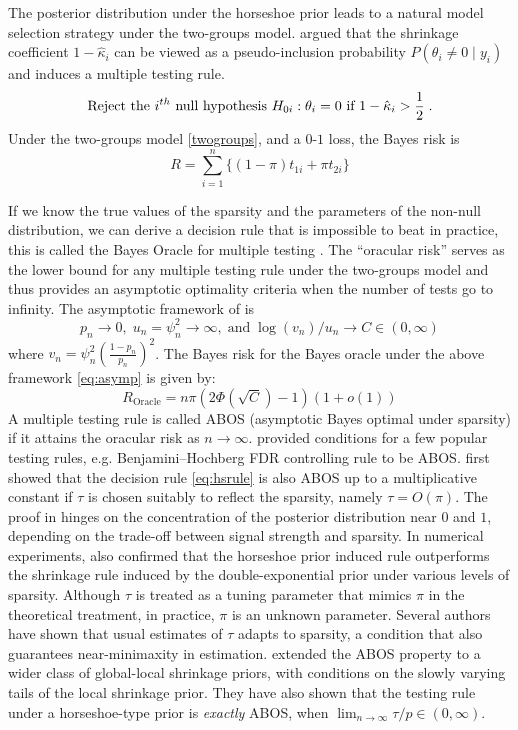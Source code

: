 \documentclass[11pt]{article}
\begin{document}
The posterior distribution under the horseshoe prior leads to a natural model
selection strategy under the two-groups model. \citet{carvalho2010horseshoe}
argued that the shrinkage coefficient $1-\hat{\kappa}_i$ can be viewed as
a pseudo-inclusion probability $P(\theta_i \ne 0 \mid y_i)$ and induces a
multiple testing rule.
\begin{equation}
  \text{Reject the $i^{th}$ null hypothesis } H_{0i} : \theta_i = 0 \text{ if }
  1-\hat{\kappa}_i > \frac{1}{2} \;. 
  \label{eq:hsrule}
\end{equation}
Under the two-groups model \eqref{twogroups}, and a $0$-$1$ loss, the Bayes risk is 
\[
R = \sum_{i=1}^{n} \{ (1- \pi) t_{1i} + \pi t_{2i} \}
\]

If we know the true values of the sparsity and the parameters of the non-null
distribution, we can derive a decision rule that is impossible to beat in
practice, this is called the Bayes Oracle for multiple testing
\citep{bogdan2011asymptotic}. The ``oracular risk'' serves as the lower bound
for any multiple testing rule under the two-groups model and thus provides an
asymptotic optimality criteria when the number of tests go to infinity. The
asymptotic framework of \citet{bogdan2011asymptotic} is 
\begin{equation}
p_n \to 0, \; u_n = \psi_n^2 \to \infty, \; \text{and} \; \log(v_n)/u_n \to C \in (0,\infty) \label{eq:asymp}
\end{equation}
where $v_n = \psi_n^2 (\frac{1-p_n}{p_n})^2$. The Bayes risk for the Bayes oracle under the above framework \eqref{eq:asymp} is given by:
\[
R_{\text{Oracle}} = n \pi (2 \Phi(\sqrt{C}) - 1)(1+o(1))
\]
A multiple testing rule is called ABOS (asymptotic Bayes optimal under
sparsity) if it attains the oracular risk as $n \to \infty$.
\citet{bogdan2011asymptotic} provided conditions for a few popular testing
rules, e.g. Benjamini--Hochberg FDR controlling rule to be ABOS.
\citet{datta2013asymptotic} first showed that the decision rule
\eqref{eq:hsrule} is also ABOS up to a multiplicative constant if $\tau$ is
chosen suitably to reflect the sparsity, namely $\tau = O(\pi)$.
The proof in \citet{datta2013asymptotic} hinges on the concentration of the posterior
distribution near $0$ and $1$, depending on the trade-off between signal
strength and sparsity.  In numerical experiments,
\citet{datta2013asymptotic} also confirmed that the horseshoe prior
induced rule outperforms the shrinkage rule induced by the double-exponential
prior under various levels of sparsity. 
Although $\tau$ is treated as a tuning parameter that mimics $\pi$ in the
theoretical treatment, in practice, $\pi$ is an unknown parameter. Several
authors \cite{datta2013asymptotic, ghosh2016asymptotic,
ghosh2016testing,van2016many} have shown that usual estimates of $\tau$ adapts
to sparsity, a condition that also guarantees near-minimaxity in estimation.
\citet{ghosh2016testing} extended the ABOS property to a wider class of
global-local shrinkage priors, with conditions on the slowly varying tails of
the local shrinkage prior. They have also shown that the testing rule under a
horseshoe-type prior is \textit{exactly} ABOS, when $\lim_{n \to \infty} \tau/p
\in (0, \infty)$. 
\end{document}
